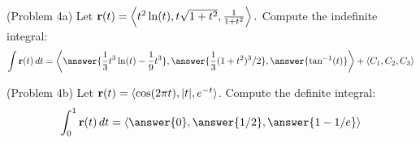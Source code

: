 \documentclass[handout]{ximera}
\begin{document}
\begin{problem}(Problem 4a)
Let $\mathbf r(t) = \left\langle t^2\ln(t),t\sqrt{1+t^2},\frac{1}{1+t^2}\right\rangle.$ Compute the indefinite integral:
\[
\int \vec r(t) \, dt = \vector{\answer{\frac13 t^3 \ln(t) - \frac19 t^3},\answer{\frac13 (1+t^2)^3/2},\answer{\tan^{-1}(t)}} + \vector{C_1, C_2, C_3}
\]

\end{problem}

\begin{problem}(Problem 4b)
Let $\mathbf r(t) = \left\langle \cos(2\pi t),|t|,e^{-t}\right\rangle$. Compute the definite integral:
\[
\int_0^1 \vec r(t) \, dt = \vector{\answer{0}, \answer{1/2}, \answer{1 - 1/e}}
\]
\end{problem}
\end{document}
